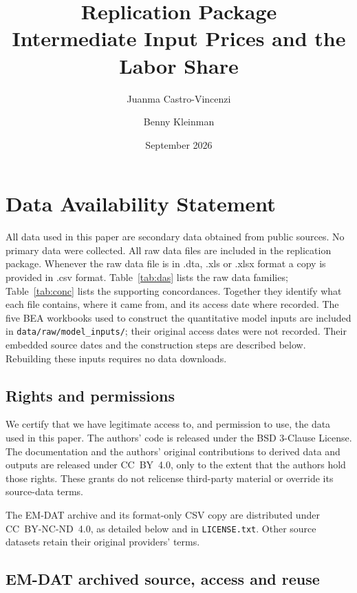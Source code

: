 \documentclass[11pt]{article}
\title{\textbf{Replication Package}\\[6pt]
       \large Intermediate Input Prices and the Labor Share}
\author{Juanma Castro-Vincenzi \and Benny Kleinman}
\date{September 2026}
\newcommand{\pkgfile}[1]{\nolinkurl{#1}}
\begin{document}
\maketitle


\tableofcontents
\clearpage

\section{Data Availability Statement}

All data used in this paper are secondary data obtained from public sources.
No primary data were collected. All raw data
files are included in the replication package. Whenever the raw data file is in .dta, .xls or .xlsx format a copy is provided in .csv format. Table~\ref{tab:das} lists the raw data families; Table~\ref{tab:conc} lists the supporting concordances. Together they identify what each file
contains, where it came from, and its access date where recorded. The five
BEA workbooks used to construct the quantitative model inputs are included
in \pkgfile{data/raw/model_inputs/}; their original access dates were not
recorded. Their embedded source dates and the construction steps are
described below. Rebuilding these inputs requires no data downloads.

\subsection*{Rights and permissions}

We certify that we have legitimate access to, and permission to use, the
data used in this paper. The authors' code is released under the BSD
3-Clause License. The documentation and the authors' original contributions
to derived data and outputs are released under CC~BY~4.0, only to the extent
that the authors hold those rights. These grants do not relicense
third-party material or override its source-data terms.

The EM-DAT archive and its format-only CSV copy are distributed under
CC~BY-NC-ND~4.0, as detailed below and in \pkgfile{LICENSE.txt}.
Other source datasets retain their original providers' terms.


\subsection*{EM-DAT archived source, access and reuse}
\end{document}

